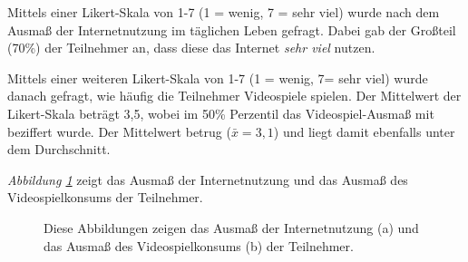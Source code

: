 \documentclass[a4paper,11pt]{article}%
\renewcommand{\\}{\vspace*{0.5\baselineskip} \newline}
\begin{document}
{{{{{Mittels einer Likert-Skala von 1-7 (1 = wenig, 7 = sehr viel) wurde nach dem Ausmaß der Internetnutzung im täglichen Leben gefragt. Dabei gab der Großteil (70\%) der Teilnehmer an, dass diese das Internet \textit{sehr viel} nutzen.

Mittels einer weiteren Likert-Skala von 1-7 (1 = wenig, 7= sehr viel) wurde danach gefragt, wie häufig die Teilnehmer Videospiele spielen. Der Mittelwert der Likert-Skala beträgt 3,5, wobei im 50\% Perzentil das Videospiel-Ausmaß mit \grqq{} beziffert wurde. Der Mittelwert betrug ($\bar{x} = 3,1$) und liegt damit ebenfalls unter dem Durchschnitt.
{\textit{Abbildung \ref{teilnehmerInternetVideospiele}} zeigt das Ausmaß der Internetnutzung und das Ausmaß des Videospielkonsums der Teilnehmer.
\begin{figure}[h]
  \centering
  \qquad
  \caption[Das Ausmaß der Internetnutzung und des Videospielkonsums der Teilnehmer]{Diese Abbildungen zeigen das Ausmaß der Internetnutzung (a) und das Ausmaß des Videospielkonsums (b) der Teilnehmer.}
  \label{teilnehmerInternetVideospiele}
\end{figure}

	
}}}}}}
\end{document}
